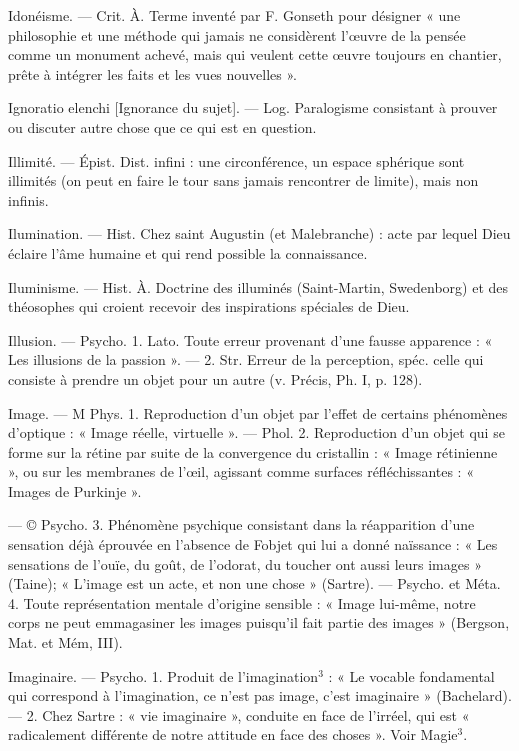 Idonéisme. — Crit. À. Terme inventé
par F. Gonseth pour désigner « une
philosophie et une méthode qui
jamais ne considèrent l’œuvre de la
pensée comme un monument achevé,
mais qui veulent cette œuvre toujours en chantier, prête à intégrer
les faits et les vues nouvelles ».

Ignoratio elenchi [Ignorance du sujet].
— Log. Paralogisme consistant à
prouver ou discuter autre chose que
ce qui est en question.

Illimité. — Épist. Dist. infini : une
circonférence, un espace sphérique
sont illimités (on peut en faire le
tour sans jamais rencontrer de
limite), mais non infinis.

Ilumination. — Hist. Chez saint Augustin (et Malebranche) : acte par
lequel Dieu éclaire l'âme humaine
et qui rend possible la connaissance.

Iluminisme. — Hist. À. Doctrine des
illuminés (Saint-Martin, Swedenborg) et des théosophes qui croient
recevoir des inspirations spéciales
de Dieu.

Illusion. — Psycho. 1. Lato. Toute
erreur provenant d’une fausse apparence : « Les illusions de la passion ».
— 2. Str. Erreur de la perception,
spéc. celle qui consiste à prendre un
objet pour un autre (v. Précis,
Ph. I, p. 128).

Image. — M Phys. 1. Reproduction
d'un objet par l'effet de certains
phénomènes d’optique : « Image
réelle, virtuelle ». — Phol. 2. Reproduction d’un objet qui se forme sur
la rétine par suite de la convergence
du cristallin : « Image rétinienne »,
ou sur les membranes de l'œil, agissant comme surfaces réfléchissantes :
« Images de Purkinje ».

— © Psycho. 3. Phénomène psychique consistant dans la réapparition d’une sensation déjà éprouvée
en l'absence de Fobjet qui lui a
donné naïssance : « Les sensations
de l’ouïe, du goût, de l’odorat, du
toucher ont aussi leurs images »
(Taine); « L'image est un acte, et
non une chose » (Sartre). — Psycho.
et Méta. 4. Toute représentation
mentale d’origine sensible : « Image
lui-même, notre corps ne peut emmagasiner les images puisqu'il fait
partie des images » (Bergson, Mat.
et Mém, III).

Imaginaire. — Psycho. 1. Produit de
l’imagination$^3$ : « Le vocable fondamental qui correspond à l’imagination, ce n’est pas image, c’est imaginaire » (Bachelard). — 2. Chez
Sartre : « vie imaginaire », conduite
en face de l’irréel, qui est « radicalement différente de notre attitude
en face des choses ». Voir Magie$^3$.

